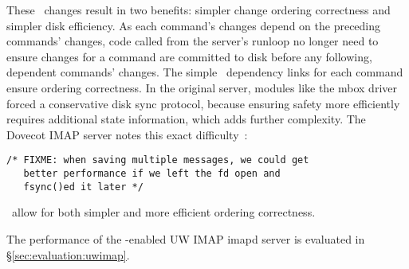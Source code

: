 These \opgroup\ changes result in two benefits: simpler change
ordering correctness and simpler disk efficiency. As each command's
changes depend on the preceding commands' changes, code called from
the server's runloop no longer need to ensure changes for a command
are committed to disk before any following, dependent commands'
changes. The simple \opgroup\ dependency links for each command ensure
ordering correctness. In the original server, modules like the mbox
driver forced a conservative disk sync protocol, because ensuring
safety more efficiently requires additional state information, which adds
further complexity. The Dovecot IMAP server notes this exact
difficulty~\cite[maildir-save.c]{dovecot}:

\vspace{-0.5\baselineskip}
\begin{scriptsize}
\begin{verbatim}
/* FIXME: when saving multiple messages, we could get
   better performance if we left the fd open and
   fsync()ed it later */
\end{verbatim}
\end{scriptsize}

\vspace{-0.5\baselineskip}
\noindent \Opgroups\ allow for both simpler and more efficient ordering correctness.

The performance of the \opgroup{}-enabled UW IMAP imapd server is
evaluated in \S\ref{sec:evaluation:uwimap}.
